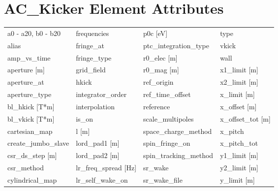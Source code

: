  \section{AC_Kicker Element Attributes}
 \label{s:list.ac.kicker}
 
 \begin{tabular}{llll} \toprule
a0 - a20, b0 - b20               & frequencies                      & p0c [eV]                         & type                             \\
alias                            & fringe_at                        & ptc_integration_type             & vkick                            \\
amp_vs_time                      & fringe_type                      & r0_elec [m]                      & wall                             \\
aperture [m]                     & grid_field                       & r0_mag [m]                       & x1_limit [m]                     \\
aperture_at                      & hkick                            & ref_origin                       & x2_limit [m]                     \\
aperture_type                    & integrator_order                 & ref_time_offset                  & x_limit [m]                      \\
bl_hkick [T*m]                   & interpolation                    & reference                        & x_offset [m]                     \\
bl_vkick [T*m]                   & is_on                            & scale_multipoles                 & x_offset_tot [m]                 \\
cartesian_map                    & l [m]                            & space_charge_method              & x_pitch                          \\
create_jumbo_slave               & lord_pad1 [m]                    & spin_fringe_on                   & x_pitch_tot                      \\
csr_ds_step [m]                  & lord_pad2 [m]                    & spin_tracking_method             & y1_limit [m]                     \\
csr_method                       & lr_freq_spread [Hz]              & sr_wake                          & y2_limit [m]                     \\
cylindrical_map                  & lr_self_wake_on                  & sr_wake_file                     & y_limit [m]                      \\

\end{tabular}
